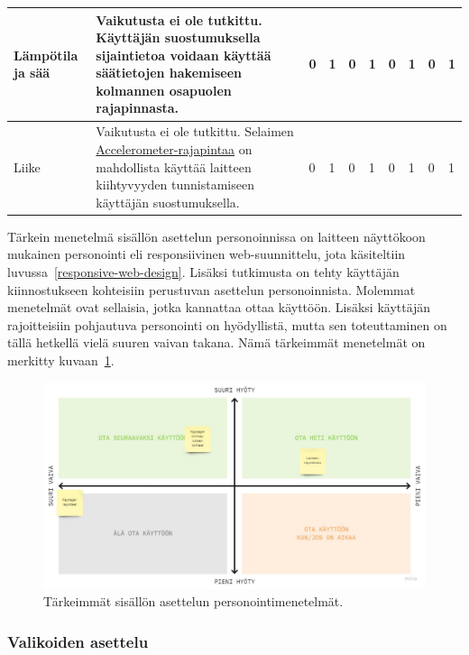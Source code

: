 \documentclass[finnish, 12pt, a4paper, elec, utf8, a-1b, online]{aaltothesis}
\begin{document}
{\begin{longtable}{p{2.5cm}|p{6cm}|p{0.5cm}p{0.5cm}p{0.5cm}|p{0.5cm}|p{0.5cm}p{0.5cm}p{0.5cm}|p{0.5cm}|}
    \\
    \midrule
    Lämpötila ja sää&Vaikutusta ei ole tutkittu. Käyttäjän suostumuksella
    sijaintietoa voidaan käyttää säätietojen hakemiseen kolmannen osapuolen
    rajapinnasta.&0&1&0&1&0&1&0&1 \\
    \midrule
    Liike&Vaikutusta ei ole tutkittu. Selaimen
    \href{https://developer.mozilla.org/en-US/docs/Web/API/Accelerometer}{Accelerometer-rajapintaa}
    on mahdollista käyttää laitteen kiihtyvyyden tunnistamiseen käyttäjän suostumuksella.&0&1&0&1&0&1&0&1
    \\
\end{longtable}
}

Tärkein menetelmä sisällön asettelun personoinnissa on laitteen näyttökoon
mukainen personointi eli responsiivinen web-suunnittelu, jota käsiteltiin
luvussa~\ref{responsive-web-design}. Lisäksi tutkimusta on tehty käyttäjän
kiinnostukseen kohteisiin perustuvan asettelun personoinnista. Molemmat
menetelmät ovat sellaisia, jotka kannattaa ottaa käyttöön. Lisäksi käyttäjän
rajoitteisiin pohjautuva personointi on hyödyllistä, mutta sen toteuttaminen on
tällä hetkellä vielä suuren vaivan takana. Nämä tärkeimmät menetelmät on
merkitty kuvaan~\ref{fig:layout-priorization}.

\begin{figure}[htb]
\centering
\includegraphics[width=\textwidth]{images/layout-priorization.pdf}
\caption{Tärkeimmät sisällön asettelun personointimenetelmät.~\label{fig:layout-priorization}}
\end{figure}

\subsubsection{Valikoiden asettelu}
\end{document}
